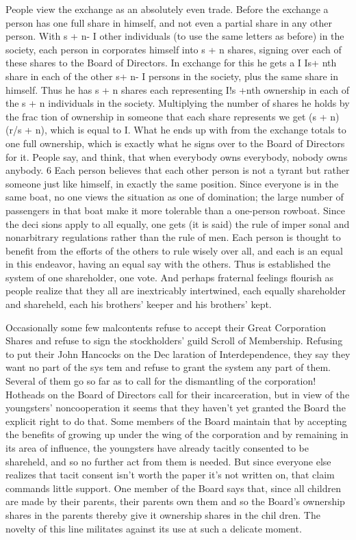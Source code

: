 \documentclass[11pt,openany]{book}
\begin{document}
People view the exchange as an absolutely even trade. Before the exchange a person has one full share in himself, and not even a partial share in any other person. With s + n- I other individuals (to use the same letters as before) in the society, each person in corporates himself into s + n shares, signing over each of these shares to the Board of Directors. In exchange for this he gets a I Is+ nth share in each of the other s+ n- I persons in the society, plus the same share in himself. Thus he has s + n shares each representing I!s +nth ownership in each of the s + n individuals in the society. Multiplying the number of shares he holds by the frac tion of ownership in someone that each share represents we get (s + n) (r/s + n), which is equal to I. What he ends up with from the exchange totals to one full ownership, which is exactly what he signs over to the Board of Directors for it. People say, and think, that when everybody owns everybody, nobody owns anybody. 6 Each person believes that each other person is not a tyrant but rather someone just like himself, in exactly the same position. Since everyone is in the same boat, no one views the situation as one of domination; the large number of passengers in that boat make it more tolerable than a one-person rowboat. Since the deci sions apply to all equally, one gets (it is said) the rule of imper sonal and nonarbitrary regulations rather than the rule of men. Each person is thought to benefit from the efforts of the others to rule wisely over all, and each is an equal in this endeavor, having an equal say with the others. Thus is established the system of one shareholder, one vote. And perhaps fraternal feelings flourish as people realize that they all are inextricably intertwined, each equally shareholder and shareheld, each his brothers' keeper and his brothers' kept. 

Occasionally some few malcontents refuse to accept their Great Corporation Shares and refuse to sign the stockholders' guild Scroll of Membership. Refusing to put their John Hancocks on the Dec laration of Interdependence, they say they want no part of the sys tem and refuse to grant the system any part of them. Several of them go so far as to call for the dismantling of the corporation! Hotheads on the Board of Directors call for their incarceration, but in view of the youngsters' noncooperation it seems that they haven't yet granted the Board the explicit right to do that. Some members of the Board maintain that by accepting the benefits of growing up under the wing of the corporation and by remaining in its area of influence, the youngsters have already tacitly consented to be shareheld, and so no further act from them is needed. But since everyone else realizes that tacit consent isn't worth the paper it's not written on, that claim commands little support. One member of the Board says that, since all children are made by their parents, their parents own them and so the Board's ownership shares in the parents thereby give it ownership shares in the chil dren. The novelty of this line militates against its use at such a delicate moment. 
\end{document}
